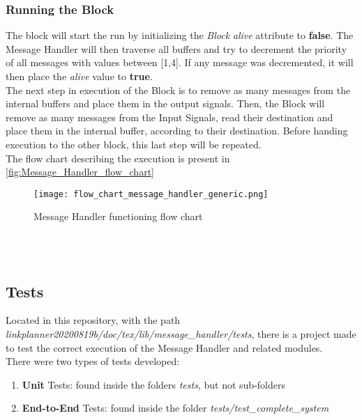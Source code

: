 \begin{refsection}
\subsubsection{Running the Block}
The block will start the run by initializing the \textit{Block} \textit{alive} 
attribute to \textbf{false}. The Message Handler will then traverse all 
buffers and try to decrement the priority of all messages with values between 
[1,4]. If any message was decremented, it will then place the \textit{alive} 
value to \textbf{true}.
\\
The next step in execution of the Block is to remove as many messages from the 
internal buffers and place them in the output signals. Then, the Block will 
remove as many messages from the Input Signals, read their destination and 
place them in the internal buffer, according to their destination. Before 
handing execution to the other block, this last step will be repeated.
\\
The flow chart describing the execution is present in 
\autoref{fig:Message_Handler_flow_chart}
\\
\begin{figure}[!b]
	\centering
	\texttt{[image: flow\_chart\_message\_handler\_generic.png]}
	\caption{Message Handler functioning flow chart}
	\label{fig:Message_Handler_flow_chart}
\end{figure}
\\
\pagebreak
\\
\subsection{Tests}

Located in this repository, with the path \textit{linkplanner20200819b/doc/tex/lib/message\_handler/tests}, 
there is a project made to test the correct execution of the Message Handler and related
modules.
\\
There were two types of tests developed:
\begin{enumerate}
	\item \textbf{Unit} Tests: found inside the folders \textit{tests}, but not sub-folders
	\item \textbf{End-to-End} Tests: found inside the folder \textit{tests/test\_complete\_system}
\end{enumerate}


\end{refsection}
